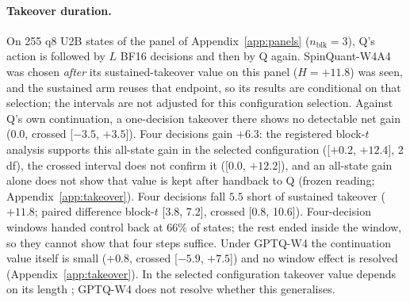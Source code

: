 \paragraph{Takeover duration.} On 255 q8 U2B states of the panel of Appendix~\ref{app:panels} ($n_{\mathrm{blk}}=3$), Q's action is followed by $L$ BF16 decisions and then by Q again. SpinQuant-W4A4 was chosen \emph{after} its sustained-takeover value on this panel ($H=+11.8$\pp{}) was seen, and the sustained arm reuses that endpoint, so its results are conditional on that selection; the intervals are not adjusted for this configuration selection. Against Q's own continuation, a one-decision takeover there shows no detectable net gain ($0.0$, crossed [$-3.5$, $+3.5$]). Four decisions gain $+6.3$\pp{}: the registered block-$t$ analysis supports this all-state gain in the selected configuration ([$+0.2$, $+12.4$], 2 df), the crossed interval does not confirm it ([0.0, $+12.2$]), and an all-state gain alone does not show that value is kept after handback to Q (frozen reading; Appendix~\ref{app:takeover}). Four decisions fall $5.5$\pp{} short of sustained takeover ($+11.8$; paired difference block-$t$ [3.8, 7.2], crossed [0.8, 10.6]). %
Four-decision windows handed control back at 66\% of states; the rest ended inside the window, so they cannot show that four steps suffice. Under GPTQ-W4 the continuation value itself is small ($+0.8$, crossed [$-5.9$, $+7.5$]) and no window effect is resolved (Appendix~\ref{app:takeover}). In the selected configuration takeover value depends on its length \citep[cf.\ handoff costs,][]{ganz2026handoff}; GPTQ-W4 does not resolve whether this generalises. %

